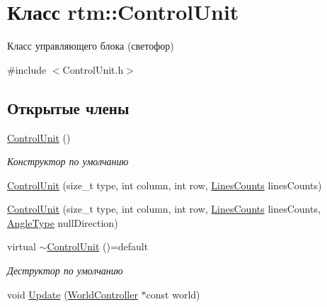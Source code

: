 \hypertarget{classrtm_1_1_control_unit}{}\section{Класс rtm\+:\+:Control\+Unit}
\label{classrtm_1_1_control_unit}


Класс управляющего блока (светофор)  




{\ttfamily \#include $<$Control\+Unit.\+h$>$}

\subsection*{Открытые члены}
\begin{DoxyCompactItemize}
\item 
\mbox{\label{classrtm_1_1_control_unit_a6faae9a6512a9f75fbe4c1c4b2f88090}} 
\hyperlink{classrtm_1_1_control_unit_a6faae9a6512a9f75fbe4c1c4b2f88090}{Control\+Unit} ()
\begin{DoxyCompactList}\small\item\em Конструктор по умолчанию \end{DoxyCompactList}\item 
\hyperlink{classrtm_1_1_control_unit_ac8a261d763f6d6632ce2c872710fe6b4}{Control\+Unit} (size\+\_\+t type, int column, int row, \hyperlink{namespacertm_a14457f3088a92b86a96686b72d3e4eea}{Lines\+Counts} lines\+Counts)
\item 
\hyperlink{classrtm_1_1_control_unit_a2c2c1f0f0196f0af82009f94bb875736}{Control\+Unit} (size\+\_\+t type, int column, int row, \hyperlink{namespacertm_a14457f3088a92b86a96686b72d3e4eea}{Lines\+Counts} lines\+Counts, \hyperlink{namespacertm_a69dc82b16a0148c10962caa83d930f89}{Angle\+Type} null\+Direction)
\item 
\mbox{\label{classrtm_1_1_control_unit_a29e6e147ae6212c9bc7cc13c5d8fdc2c}} 
virtual \hyperlink{classrtm_1_1_control_unit_a29e6e147ae6212c9bc7cc13c5d8fdc2c}{$\sim$\+Control\+Unit} ()=default
\begin{DoxyCompactList}\small\item\em Деструктор по умолчанию \end{DoxyCompactList}\item 
void \hyperlink{classrtm_1_1_control_unit_afb3eba6577d912109784ac1d32338859}{Update} (\hyperlink{classrtm_1_1_world_controller}{World\+Controller} $\ast$const world)

\end{DoxyCompactItemize}

